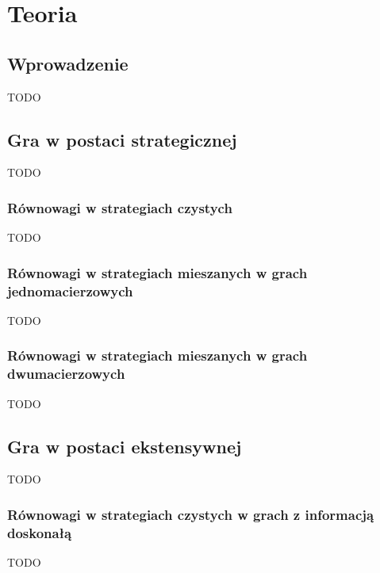 \documentclass{standalone}
\begin{document}
\pagestyle{headings}

\chapter{Teoria}

\section{Wprowadzenie}

TODO

\section{Gra w postaci strategicznej}

TODO

\subsection{Równowagi w strategiach czystych}

TODO

\subsection{Równowagi w strategiach mieszanych w grach jednomacierzowych}

TODO

\subsection{Równowagi w strategiach mieszanych w grach dwumacierzowych}

TODO

\section{Gra w postaci ekstensywnej}

TODO

\subsection{Równowagi w strategiach czystych w grach z informacją doskonałą}

TODO
\end{document}
